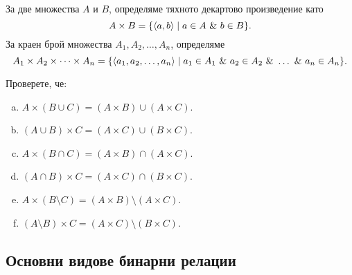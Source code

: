За две множества $A$ и $B$, определяме тяхното декартово произведение като
\[A\times B = \{\langle{a,b}\rangle\mid a\in A\ \&\ b\in B\}.\]
За краен брой множества $A_1,A_2,\dots,A_n$, определяме
\[A_1\times A_2\times\cdots\times A_n = \{\pair{a_1,a_2,\dots,a_n}\mid a_1 \in A_1\ \&\ a_2\in A_2\ \&\ \dots\ \&\ a_n \in A_n\}.\]

\begin{problem}
  Проверете, че:
  \begin{enumerate}[a)]
  \item
    $A\times(B\cup C) = (A\times B) \cup (A\times C)$.
  \item
    $(A\cup B)\times C = (A\times C)\cup (B\times C)$.
  \item 
    $A\times(B\cap C) = (A\times B) \cap (A\times C)$.
  \item
    $(A \cap B)\times C = (A \times C)\cap(B\times C)$.
  \item 
    $A\times(B\setminus C) = (A\times B) \setminus (A\times C)$.
  \item
    $(A\setminus B)\times C = (A\times C)\setminus (B\times C)$.
  \end{enumerate}
\end{problem}

\subsection*{Основни видове бинарни релации}

